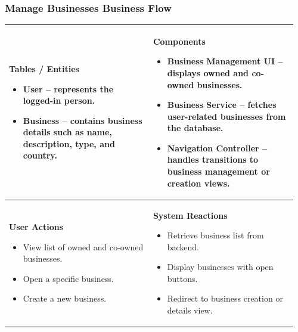 \documentclass[]{VUMIFTemplateClass}
\newenvironment{mpitemlist}[1][\linewidth]{%
    \begin{minipage}[t]{#1}%
        \setlength{\leftmargini}{12pt}%
        \begin{itemize}%
            \setlength{\itemsep}{1pt}%
            \setlength{\parskip}{0pt}%
            \setlength{\parsep}{0pt}%
}{%
        \end{itemize}%
    \end{minipage}\newline
}
\begin{document}
\subsubsection{Manage Businesses Business Flow}
\begin{center}
\setlength{\tabcolsep}{8pt}
\renewcommand{\arraystretch}{1.3}
\begin{tabular}{|p{0.48\linewidth}|p{0.48\linewidth}|}
\hline
\textbf{Tables / Entities} \newline
\begin{mpitemlist}
\item \textbf{User} – represents the logged-in person.
\item \textbf{Business} – contains business details such as name, description, type, and country.
\end{mpitemlist}
&
\textbf{Components} \newline
\begin{mpitemlist}
\item \textbf{Business Management UI} – displays owned and co-owned businesses.
\item \textbf{Business Service} – fetches user-related businesses from the database.
\item \textbf{Navigation Controller} – handles transitions to business management or creation views.
\end{mpitemlist}
\\ \hline
\textbf{User Actions} \newline
\begin{mpitemlist}
\item View list of owned and co-owned businesses.
\item Open a specific business.
\item Create a new business.
\end{mpitemlist}
&
\textbf{System Reactions} \newline
\begin{mpitemlist}
\item Retrieve business list from backend.
\item Display businesses with open buttons.
\item Redirect to business creation or details view.
\end{mpitemlist}
\\ \hline
\end{tabular}
\end{center}
\end{document}
